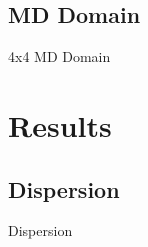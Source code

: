 \documentclass{beamer}
\begin{document}
\subsection{MD Domain}
\begin{frame}{\small{4x4 MD Domain}}
\begin{figure}[t]
\begin{center}
\vspace*{-0.8cm}
\renewcommand{\figure}{Fig.}
\label{fig:md_domain}
\end{center}
\end{figure}
\end{frame}



\section{Results}
\subsection{Dispersion}
\begin{frame}{\small{Dispersion}}
\begin{figure}[!h]
\vspace*{-0.6cm}
\begin{center}
\renewcommand{\figure}{Fig.}
\label{fig:sed}
\end{center}
\end{figure}
\begin{figure}[!h]
\vspace*{-0.4cm}
\begin{center}
\renewcommand{\figure}{Fig.}
\label{fig:dispersion}
\end{center}
\end{figure}
\end{frame}


\end{document}
